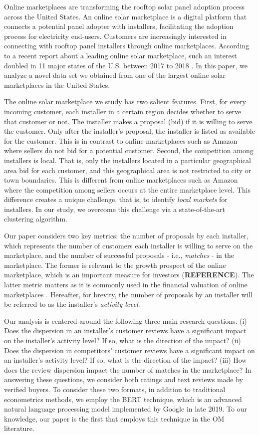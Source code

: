 \documentclass[msom,blindrev]{informs3}
\begin{document}
 Online marketplaces are transforming the rooftop solar panel adoption process across the United States. An online solar marketplace is a digital platform that connects a potential panel adopter with installers, facilitating the adoption process for electricity end-users. Customers are increasingly interested in connecting with rooftop panel installers through online marketplaces. According to a recent report about a leading online solar marketplace, such an interest doubled in 11 major states of the U.S. between 2017 to 2018 \citep{energysageintel19}.  In this paper, we analyze a novel data set we obtained from one of the largest online solar marketplaces in the United States.


The online solar marketplace we study has two salient features. First, for every incoming customer, each installer in a certain region decides whether to serve that customer or not. The installer makes a proposal (bid) if it is willing to serve the customer. Only after the installer's proposal, the installer is listed as available for the customer. This is in contrast to online marketplaces such as Amazon where sellers do not bid for a potential customer. Second, the competition among installers is local. That is, only the installers located in a particular geographical area bid for each customer, and this geographical area is not restricted to city or town boundaries. This is different from online marketplaces such as Amazon where the competition among sellers occurs at the entire marketplace level. This difference creates a unique challenge, that is, to identify \emph{local markets} for installers. In our study, we overcome this challenge via a state-of-the-art clustering algorithm.

Our paper considers two key metrics: the number of proposals by each installer, which represents the number of customers each installer is willing to serve on the marketplace, and the number of successful proposals - i.e., \emph{matches} - in the marketplace. The former is relevant to the growth prospect of the online marketplace, which is an important measure for investors (\textbf{REFERENCE}).  The latter metric matters as it is commonly used in the financial valuation of online marketplaces \citep{boris_2018,galston_2017}. Hereafter, for brevity,  the number of proposals by an installer will be referred to as the installer's \emph{activity level}.

Our analysis is centered around the following three main research questions. (i) Does the dispersion in an installer's customer reviews have a significant impact on the installer's activity level?  If so, what is the direction of the impact? (ii) Does the dispersion in competitors' customer reviews have a significant impact on an installer's activity level? If so, what is the direction of the impact? (iii) How does the review dispersion impact the number of matches in the marketplace?  In answering these questions, we consider both  ratings and text reviews made by verified buyers. To consider these two formats, in addition to traditional econometrics methods, we employ the BERT technique, which is an advanced natural language processing model implemented by Google in late 2019. To our knowledge, our paper is the first that employs this technique in the OM literature.
\end{document}
